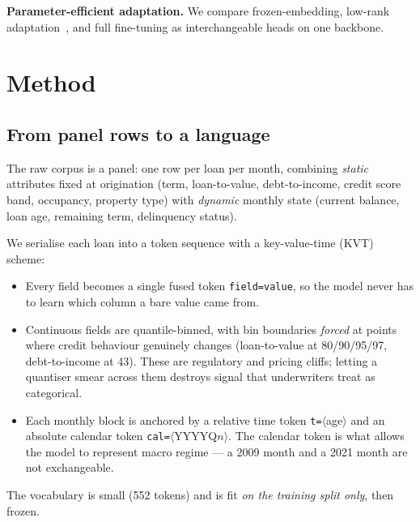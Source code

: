 \documentclass[10pt,letterpaper]{article}
\begin{document}
\textbf{Parameter-efficient adaptation.}
We compare frozen-embedding, low-rank adaptation~\cite{hu2021lora}, and full fine-tuning as
interchangeable heads on one backbone.

\section{Method}
\label{sec:method}

\subsection{From panel rows to a language}
The raw corpus is a panel: one row per loan per month, combining \emph{static} attributes fixed at
origination (term, loan-to-value, debt-to-income, credit score band, occupancy, property type) with
\emph{dynamic} monthly state (current balance, loan age, remaining term, delinquency status).

We serialise each loan into a token sequence with a key-value-time (KVT) scheme:
\begin{itemize}
  \item Every field becomes a single fused token \texttt{field=value}, so the model never has to
        learn which column a bare value came from.
  \item Continuous fields are quantile-binned, with bin boundaries \emph{forced} at points where
        credit behaviour genuinely changes (loan-to-value at 80/90/95/97, debt-to-income at 43).
        These are regulatory and pricing cliffs; letting a quantiser smear across them destroys
        signal that underwriters treat as categorical.
  \item Each monthly block is anchored by a relative time token \texttt{t=}$\langle$age$\rangle$ and
        an absolute calendar token \texttt{cal=}$\langle$YYYYQ$n\rangle$. The calendar token is what
        allows the model to represent macro regime --- a 2009 month and a 2021 month are not
        exchangeable.
\end{itemize}
The vocabulary is small (552 tokens) and is fit \emph{on the training split only}, then frozen.
\end{document}
